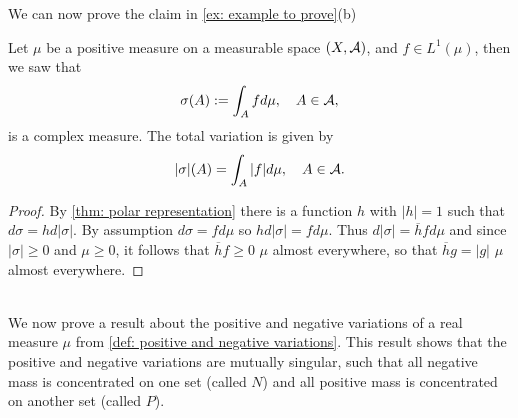 \documentclass[../../main.tex]{subfiles}
\begin{document}
We can now prove the claim in \cref{ex: example to prove}(b)
\begin{theorem}\label{thm: later proof}
Let $\mu$ be a positive measure on a measurable space $(X, \mathcal{A})$, and $f\in L^{1}(\mu)$, then we saw that
\begin{align*}
	\sigma(A):=\int_{A}fd\mu, \quad A\in \mathcal{A},
\end{align*}
is a complex measure. The total variation is given by
\begin{align*}
	|\sigma|(A)=\int_{A}|f|d\mu, \quad A\in \mathcal{A}.
\end{align*}
\end{theorem}
\begin{proof}
By \cref{thm: polar representation} there is a function $h$ with $|h|=1$ such that $d\sigma=hd|\sigma|$. By assumption $d\sigma=fd\mu$ so $hd|\sigma|=fd\mu$. Thus $d|\sigma|=\overline{h}fd\mu$ and since $|\sigma|\ge 0$ and $\mu\ge 0$, it follows that $\overline{h}f\ge 0$ $\mu$ almost everywhere, so that $\overline{h}g=|g|$ $\mu$ almost everywhere.
\end{proof}
\text{ }\\
We now prove a result about the positive and negative variations of a real measure $\mu$ from \cref{def: positive and negative variations}. This result shows that the positive and negative variations are mutually singular, such that all negative mass is concentrated on one set (called $N$) and all positive mass is concentrated on another set (called $P$).
\end{document}
